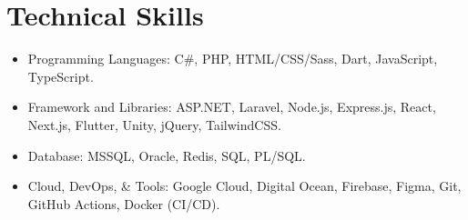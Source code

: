 \section{Technical Skills}

\begin{itemize}[itemsep=1pt, parsep=0pt, topsep=0pt]
    \item Programming Languages: C\#, PHP, HTML/CSS/Sass, Dart, JavaScript, TypeScript.
    \item Framework and Libraries: ASP.NET, Laravel, Node.js, Express.js, React, Next.js, Flutter, Unity, jQuery, TailwindCSS.
    \item Database: MSSQL, Oracle, Redis, SQL, PL/SQL.
    \item Cloud, DevOps, \& Tools: Google Cloud, Digital Ocean, Firebase, Figma, Git, GitHub Actions, Docker (CI/CD).
\end{itemize}